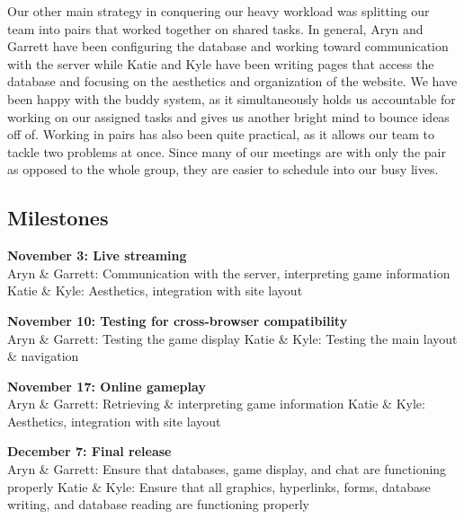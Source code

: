Our other main strategy in conquering our heavy workload was splitting our team into pairs that worked together on shared tasks. In general, Aryn and Garrett have been configuring the database and working toward communication with the server while Katie and Kyle have been writing pages that access the database and focusing on the aesthetics and organization of the website. We have been happy with the buddy system, as it simultaneously holds us accountable for working on our assigned tasks and gives us another bright mind to bounce ideas off of. Working in pairs has also been quite practical, as it allows our team to tackle two problems at once. Since many of our meetings are with only the pair as opposed to the whole group, they are easier to schedule into our busy lives.








		\subsection{Milestones}
		\begin{description}
			\item \textbf{November 3: Live streaming}
\\Aryn \& Garrett: Communication with the server, interpreting game information
Katie \& Kyle: Aesthetics, integration with site layout


\item \textbf{November 10: Testing for cross-browser compatibility}
\\Aryn \& Garrett: Testing the game display
Katie \& Kyle: Testing the main layout \& navigation


\item \textbf{November 17: Online gameplay}
\\Aryn \& Garrett: Retrieving \& interpreting game information
Katie \& Kyle: Aesthetics, integration with site layout


\item \textbf{December 7: Final release}
\\Aryn \& Garrett: Ensure that databases, game display, and chat are functioning properly
Katie \& Kyle: Ensure that all graphics, hyperlinks, forms, database writing, and database reading are functioning properly
\end{description}
